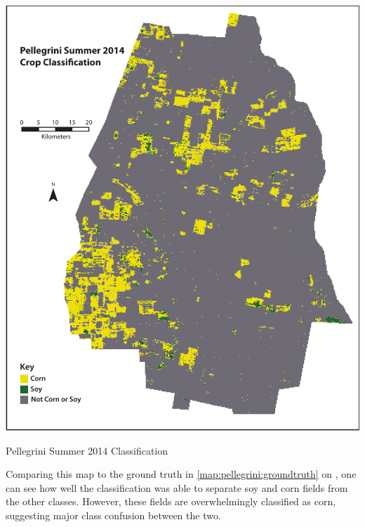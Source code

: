 \begin{ssfigure}
  \centering
  \includegraphics[width=\textwidth]{Graphics/ARclassed.pdf}
  \caption[Pellegrini Summer 2014 Classification]{Pellegrini Summer 2014 Classification}
  \medskip
  \small
  Comparing this map to the ground truth in \cref{map:pellegrini:groundtruth} on , one can see how well the classification was able to separate soy and corn fields from the other classes. However, these fields are overwhelmingly classified as corn, suggesting major class confusion between the two. 
  \label{map:ARclassification}
\end{ssfigure}